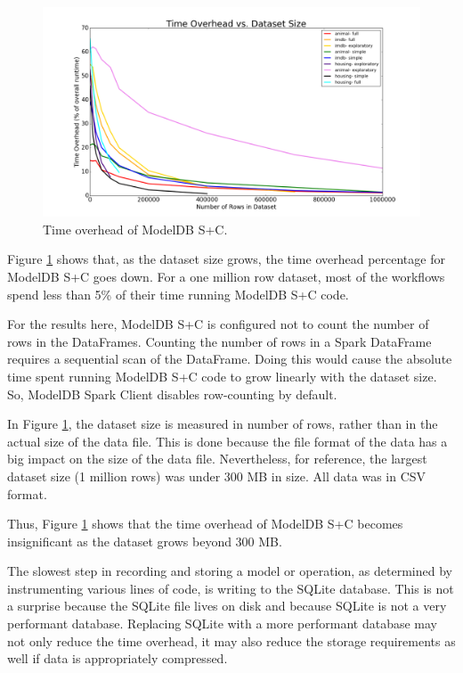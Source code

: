 \begin{figure}
  \centering
  \includegraphics[width=6.0in]{time_overhead}
  \caption{
    Time overhead of ModelDB S+C.
  }
  \label{fig:time_overhead}
\end{figure}

Figure \ref{fig:time_overhead} shows that, as the dataset size grows, the time overhead
percentage for ModelDB S+C goes down. For a one million row dataset,
most of the workflows spend less than 5\% of their time running ModelDB S+C code.

For the results here, ModelDB S+C is configured not to count the number of rows in the DataFrames.
Counting the number of rows in a Spark DataFrame requires a sequential scan of the DataFrame. Doing this
would cause the absolute time spent running ModelDB S+C code to grow linearly with the dataset size. So, ModelDB Spark
Client disables row-counting by default.

In Figure \ref{fig:time_overhead}, the dataset size is measured in number of rows, rather than in
the actual size of the data file. This is done because the file format of the data has a big impact on
the size of the data file. Nevertheless, for reference, the largest dataset size (1 million rows) was under 300 MB
in size. All data was in CSV format.

Thus, Figure \ref{fig:time_overhead} shows that the time overhead of ModelDB S+C becomes insignificant 
as the dataset grows beyond 300 MB. 

The slowest step in recording and storing a model or operation, as determined by 
instrumenting various lines of code, is writing to the SQLite database. This is not a surprise
because the SQLite file lives on disk and because SQLite is not a very performant database.
Replacing SQLite with a more performant database may not only reduce the time overhead, it may
also reduce the storage requirements as well if data is appropriately compressed.

